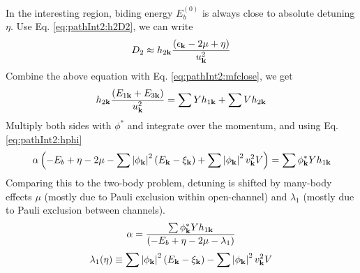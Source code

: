In the interesting region, biding energy $E_{b}^{(0)}$ is always close to absolute detuning $\eta$.   
Use Eq. \ref{eq:pathInt2:h2D2}, we can write 
\begin{equation*}
D_{2}\approx{}h_{2\mathbf{k}}\frac{(\epsilon_{\mathbf{k}}-2\mu+\eta)}{u_{\mathbf{k}}^{2}}
\end{equation*}
Combine the above equation with Eq. \ref{eq:pathInt2:mfclose}, we get 
\begin{equation*}
h_{2\mathbf{k}}\frac{(E_{1\mathbf{k}}+E_{3\mathbf{k}})}{u_{\mathbf{k}}^{2}}=\sum{}Yh_{1\mathbf{k}}+\sum{}Vh_{2\mathbf{k}}
\end{equation*}
Multiply both sides with $\phi^{*}$ and integrate over the momentum, and using Eq. \ref{eq:pathInt2:hphi}
\begin{equation}
\alpha\left(-E_{b}+\eta-2\mu-\sum\left\lvert{\phi_{\ensuremath{\mathbf{k}}}}\right\rvert^{2}{(E_{\mathbf{k}}-\xi_{\mathbf{k}})}+\sum\left\lvert{\phi_{\ensuremath{\mathbf{k}}}}\right\rvert^{2}{v_{\mathbf{k}}^{2}V}\right)=\sum{\phi_{\ensuremath{\mathbf{k}}}^{*}}{Y}{h_{1\ensuremath{\mathbf{k}}}}
\end{equation}
Comparing this to the two-body problem, detuning is shifted by many-body effects $\mu$ (mostly due to Pauli exclusion within open-channel) and $\lambda_{1}$ (mostly due to Pauli exclusion between channels).  
\begin{equation}\label{eq:pathInt2:alpha}
\alpha=\frac{\sum{\phi_{\ensuremath{\mathbf{k}}}^{*}}{Y}{h_{1\ensuremath{\mathbf{k}}}}}{\left(-E_{b}+\eta-2\mu-\lambda_{1}\right)}
\end{equation}
\begin{equation}\label{eq:pathInt2:lambda1}
\lambda_{1}(\eta)\equiv\sum\left\lvert{\phi_{\ensuremath{\mathbf{k}}}}\right\rvert^{2}{(E_{\mathbf{k}}-\xi_{\mathbf{k}})}-\sum\left\lvert{\phi_{\ensuremath{\mathbf{k}}}}\right\rvert^{2}{v_{\mathbf{k}}^{2}V}
\end{equation}

